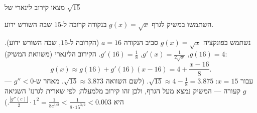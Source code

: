 
\begin{question}
מצאו קירוב לינארי של $\sqrt{15}$
\end{question}

\begin{hint}
השתמשו במשיק לגרף $g(x)=\sqrt x$ בנקודה קרובה ל-$15$ שבה השורש ידוע.
\end{hint}

\begin{solution}
נשתמש בפונקציה $g(x)=\sqrt x$ סביב הנקודה $a=16$ (הקרובה ל-$15$, שבה השורש ידוע). $g(16)=4$, $g'(x)=\frac{1}{2\sqrt x}$, $g'(16)=\frac18$. הקירוב הלינארי (משוואת המשיק):
\[ g(x)\approx g(16)+g'(16)(x-16)=4+\frac{x-16}{8}. \]
עבור $x=15$: $\sqrt{15}\approx4-\frac18=\boxed{3.875}$.
(לשם השוואה $\sqrt{15}\approx3.873$. מאחר ש-$g''<0$ — $g$ קעורה — המשיק נמצא מעל הגרף, ולכן זהו קירוב מלמעלה; לפי שארית לגרנז' השגיאה היא $\frac{|g''(c)|}{2}\cdot1^2=\frac{1}{8c^{3/2}}<\frac{1}{8\cdot 15^{3/2}}<0.003$.)
\end{solution}

